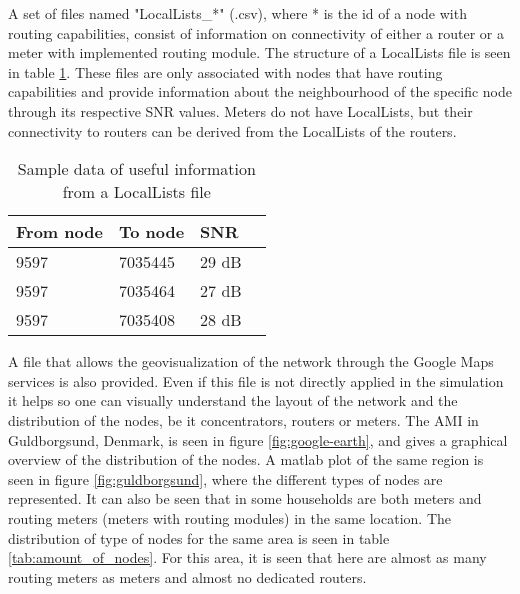 A set of files named "LocalLists\_*" (.csv), where * is the id of a node with routing capabilities, consist of information on connectivity of either a router or a meter with implemented routing module. The structure of a LocalLists file is seen in table \ref{tab:locallists}. These files are only associated with nodes that have routing capabilities and provide information about the neighbourhood of the specific node through its respective SNR values. Meters do not have LocalLists, but their connectivity to routers can be derived from the LocalLists of the routers.

\begin{table}[H]
\begin{center}
    \begin{tabular}{ | l | l | l | l |}
    \hline
    From node & To node & SNR\\ \hline
    9597 & 7035445 & 29 dB \\ \hline
    9597 & 7035464 & 27 dB \\ \hline
    9597 & 7035408 & 28 dB \\
    \hline
    \end{tabular}
\end{center}
\caption{Sample data of useful information from a LocalLists file}
\label{tab:locallists}
\end{table}


A file that allows the geovisualization of the network through the Google Maps services is also provided. Even if this file is not directly applied in the simulation it helps so one can visually understand the layout of the network and the distribution of the nodes, be it concentrators, routers or meters. The AMI in Guldborgsund, Denmark, is seen in figure \ref{fig:google-earth}, and gives a graphical overview of the distribution of the nodes. A matlab plot of the same region is seen in figure \ref{fig:guldborgsund}, where the different types of nodes are represented. It can also be seen that in some households are both meters and routing meters (meters with routing modules) in the same location. The distribution of type of nodes for the same area is seen in table \ref{tab:amount_of_nodes}. For this area, it is seen that here are almost as many routing meters as meters and almost no dedicated routers.

